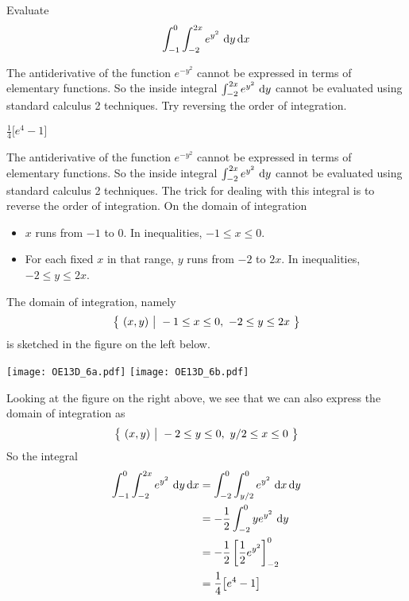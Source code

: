 \begin{question}[M200 2013D] %
Evaluate
\begin{equation*}
\int_{-1}^0 \int_{-2}^{2x} e^{y^2}\ \mathrm{d}y\,\mathrm{d}x
\end{equation*}
\end{question}

\begin{hint}
The antiderivative of the function $e^{-y^2}$ cannot be expressed
in terms of elementary functions. So the inside integral 
$\int_{-2}^{2x} e^{y^2}\ \dee{y}$ cannot be evaluated using 
standard calculus 2 techniques. Try reversing the order of integration.
\end{hint}

\begin{answer}
$\frac{1}{4}\big[e^4-1\big]$
\end{answer}

\begin{solution}
The antiderivative of the function $e^{-y^2}$ cannot be expressed
in terms of elementary functions. So the inside integral 
$\int_{-2}^{2x} e^{y^2}\ \dee{y}$ cannot be evaluated using 
standard calculus 2 techniques. The trick for dealing with this
integral is to reverse the order of integration.
On the domain of integration 
\begin{itemize}
\item
$x$ runs from $-1$ to $0$. In inequalities, $-1\le x\le 0$.
\item
For each fixed $x$ in that range, $y$ runs from $-2$ to
$2x$. In inequalities,  $-2\le y\le 2x$.
\end{itemize}
The domain of integration, namely
\begin{equation*}
\big\{ \ (x,y)\ \big|\ -1\le x\le 0,\ -2\le y\le 2x\ \big\}
\end{equation*} 
is sketched in the figure on the left below.

\begin{center}
     \texttt{[image: OE13D\_6a.pdf]}\qquad
     \texttt{[image: OE13D\_6b.pdf]}
\end{center}

Looking at the figure on the right above, we see that we can also 
express the domain of integration as
\begin{equation*}
\big\{ \ (x,y)\ \big|\ -2\le y\le 0,\ y/2\le x\le 0\ \big\}
\end{equation*} 
So the integral 
\begin{align*}
\int_{-1}^0 \int_{-2}^{2x} e^{y^2}\ \mathrm{d}y\,\mathrm{d}x
&=\int_{-2}^0 \int_{y/2}^{0} e^{y^2}\ \mathrm{d}x\,\mathrm{d}y \\
&=-\frac{1}{2}\int_{-2}^0  y e^{y^2}\ \mathrm{d}y \\
&=-\frac{1}{2}\left[\frac{1}{2}e^{y^2}\right]_{-2}^0 \\
&=\frac{1}{4}\big[e^4-1\big]
\end{align*}
\end{solution}

